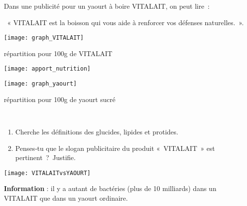 \begin{enigme}

Dans une publicité pour un yaourt à boire VITALAIT, on peut lire :

 « VITALAIT est la boisson qui vous aide à renforcer vos défenses naturelles. ».


\begin{minipage}[c]{0.31\linewidth} 
 \begin{center} \texttt{[image: graph\_VITALAIT]} \end{center}
 \begin{center} \small{répartition pour 100g de VITALAIT} \end{center}
 \end{minipage} \hfill%
 \begin{minipage}[c]{0.31\linewidth} 
 \begin{center} \texttt{[image: apport\_nutrition]} \end{center}
 \end{minipage} \hfill%
 \begin{minipage}[c]{0.31\linewidth}
 \begin{center} \texttt{[image: graph\_yaourt]} \end{center}
 \begin{center} \small{répartition pour 100g de yaourt sucré} \end{center}
  \end{minipage} \\

\begin{enumerate}
 \item Cherche les définitions des glucides, lipides et protides.
 \item Penses‑tu que le slogan publicitaire du produit « VITALAIT » est pertinent ? Justifie.
 \end{enumerate}

\begin{minipage}[c]{0.2\linewidth}   
 \texttt{[image: VITALAITvsYAOURT]}
 \end{minipage}
 \begin{minipage}[c]{0.38\linewidth} 
 \textbf{\textcolor{C1}{Information}} : il y a autant de bactéries (plus de 10 milliards) dans un VITALAIT que dans un yaourt ordinaire.
 \end{minipage} \\
\end{enigme} 
